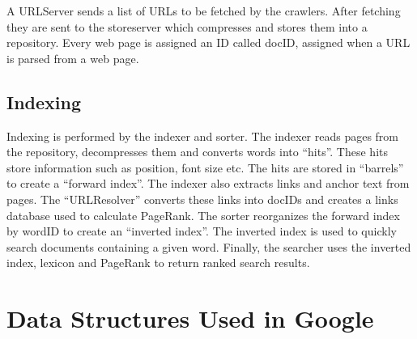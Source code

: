 \documentclass[10pt,a4paper]{article}
\begin{document}
A URLServer sends a list of URLs to be fetched by the crawlers. After fetching they are sent to the storeserver which compresses and stores them into a repository. Every web page is assigned an ID called docID, assigned when a URL is parsed from a web page.

\subsection{Indexing}

Indexing is performed by the indexer and sorter. The indexer reads pages from the repository, decompresses them and converts words into ``hits''. These hits store information such as position, font size etc. The hits are stored in ``barrels'' to create a ``forward index''. The indexer also extracts links and anchor text from pages. The ``URLResolver'' converts these links into docIDs and creates a links database used to calculate PageRank. The sorter reorganizes the forward index by wordID to create an ``inverted index''. The inverted index is used to quickly search documents containing a given word. Finally, the searcher uses the inverted index, lexicon and PageRank to return ranked search results.

\section{Data Structures Used in Google}
\end{document}
